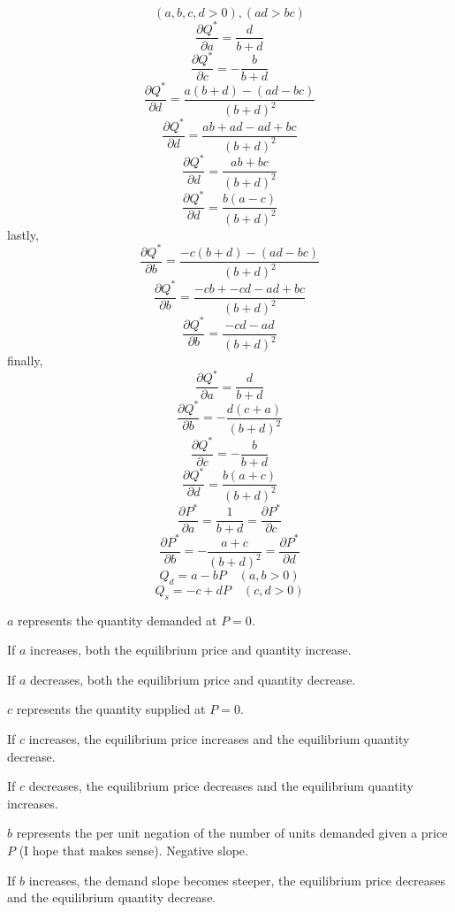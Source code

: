 \documentclass[12pt]{article}
\newcounter{ques}
\newenvironment{question}{\stepcounter{ques}{\noindent\bf Question \arabic{ques}:}}{\vspace{5mm}}
\begin{document}
\begin{question}
\begin{enumerate}[label=(\alph*)]
            $$(a, b, c, d > 0), (ad > bc)$$
            $$ \frac{\partial Q^*}{\partial a} = \frac{d}{b+d} 
            $$
            $$ \frac{\partial Q^*}{\partial c} = -\frac{b}{b+d} 
            $$
            $$ \frac{\partial Q^*}{\partial d} = \frac{a(b+d) - (ad -bc)}{(b+d)^2} 
            $$
            $$ \frac{\partial Q^*}{\partial d} = \frac{ab+ad - ad +bc}{(b+d)^2} 
            $$
            $$ \frac{\partial Q^*}{\partial d} = \frac{ab +bc}{(b+d)^2} 
            $$
            $$ \frac{\partial Q^*}{\partial d} = \frac{b(a-c)}{(b+d)^2} 
            $$
            lastly,
            $$ \frac{\partial Q^*}{\partial b} = \frac{-c(b+d) - (ad -bc)}{(b+d)^2} 
            $$
            $$ \frac{\partial Q^*}{\partial b} = \frac{-cb+-cd - ad +bc}{(b+d)^2} 
            $$
            $$ \frac{\partial Q^*}{\partial b} = \frac{-cd - ad }{(b+d)^2} 
            $$
            finally,
            $$ \frac{\partial Q^*}{\partial a} = \frac{d}{b+d}
            $$
            $$ \frac{\partial Q^*}{\partial b} = -\frac{d(c + a) }{(b+d)^2} 
            $$
            $$ \frac{\partial Q^*}{\partial c} = -\frac{b}{b+d}
            $$
            $$ \frac{\partial Q^*}{\partial d} = \frac{b(a+c)}{(b+d)^2} 
            $$
            $$ \frac{\partial P^*}{\partial a} = \frac{1}{b+d} = \frac{\partial P^*}{\partial c}
            $$
            $$ \frac{\partial P^*}{\partial b} = -\frac{a + c}{(b+d)^2} = \frac{\partial P^*}{\partial d}
            $$
            $$Q_d = a-bP \quad (a, b> 0)$$
            $$Q_s = -c +dP \quad (c, d > 0)$$

       
            $a$ represents the quantity demanded at $P = 0$.

            If $a$ increases, both the equilibrium price and quantity increase.

            If $a$ decreases, both the equilibrium price and quantity decrease.

            $c$ represents the quantity supplied at $P = 0$.

            If $c$ increases, the equilibrium price increases and the equilibrium quantity decrease.

            If $c$ decreases, the equilibrium price decreases and the equilibrium quantity increases.

            $b$ represents the per unit negation of the number of units demanded given a price $P$ (I hope that makes sense). Negative slope.
            
            If $b$ increases, the demand slope becomes steeper, the equilibrium price decreases and the equilibrium quantity decrease.


\end{enumerate}
\end{question}
\end{document}
